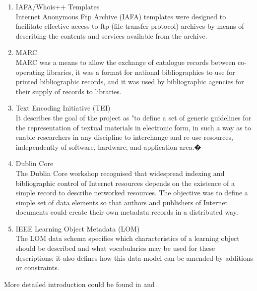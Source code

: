 \documentclass[a4paper]{article} %
\begin{document}
\begin{enumerate}
	\item IAFA/Whois++ Templates\\
	Internet Anonymous Ftp Archive (IAFA) templates were designed to facilitate effective access to ftp (file transfer protocol) archives by means of describing the contents and services available from the archive.	
	
	\item MARC\\
	MARC was a means to allow the exchange of catalogue records between co-operating libraries, it was a format for national bibliographies to use for printed bibliographic records, and it was used by bibliographic agencies for their supply of records to libraries.
	
	\item Text Encoding Initiative (TEI)\\
	It describes the goal of the project as "to define a set of generic guidelines for the representation of textual materials in electronic form, in such a way as to enable researchers in any discipline to interchange and re-use resources, independently of software, hardware, and application area.�	
	
	\item Dublin Core\\
	The Dublin Core workshop recognised that widespread indexing and bibliographic control of Internet resources depends on the existence of a simple record to describe networked resources. The objective was to define a simple set of data elements so that authors and publishers of Internet documents could create their own metadata records in a distributed way.
	
	\item IEEE Learning Object Metadata (LOM)\\
	The LOM data schema specifies which characteristics of a learning object should be described and what vocabularies may be used for these descriptions; it also defines how this data model can be amended by additions or constraints.	
\end{enumerate}

More detailed introduction could be found in {\bf\cite{1:1:1}} and {\bf\cite{Rachel:2009:reviewofmetadataformats}}.

\end{document}
